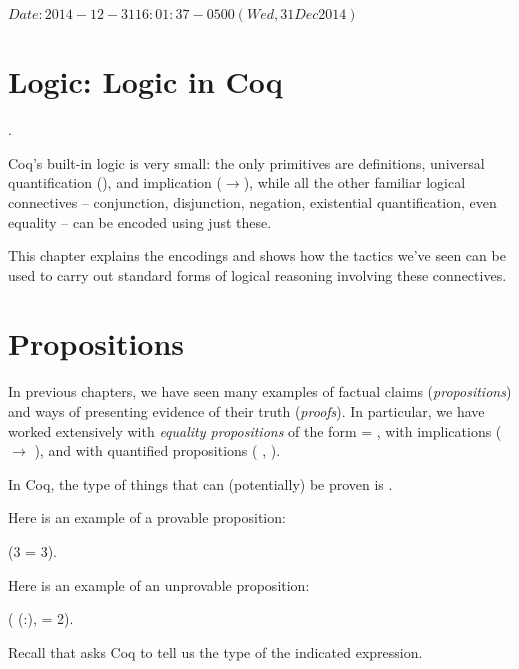 \documentclass[12pt]{report}
\begin{document}
 $Date: 2014-12-31 16:01:37 -0500 (Wed, 31 Dec 2014) $ \begin{coqdoccode}
\coqdocemptyline
\end{coqdoccode}

\begin{coqdoccode}
\end{coqdoccode}
\section{Logic: Logic in Coq}

\begin{coqdoccode}
\coqdocemptyline
\coqdocnoindent
{}  .\coqdoceol
\coqdocemptyline
\end{coqdoccode}
Coq's built-in logic is very small: the only primitives are
     definitions, universal quantification (\coqdockw{\ensuremath{\forall}}), and
    implication (\ensuremath{\rightarrow}), while all the other familiar logical
    connectives -- conjunction, disjunction, negation, existential
    quantification, even equality -- can be encoded using just these.


    This chapter explains the encodings and shows how the tactics
    we've seen can be used to carry out standard forms of logical
    reasoning involving these connectives.


\begin{coqdoccode}
\coqdocemptyline
\end{coqdoccode}
\section{Propositions}



 In previous chapters, we have seen many examples of factual
    claims (\textit{propositions}) and ways of presenting evidence of their
    truth (\textit{proofs}).  In particular, we have worked extensively with
    \textit{equality propositions} of the form  = , with
    implications ( \ensuremath{\rightarrow} ), and with quantified propositions 
    (\coqdockw{\ensuremath{\forall}} , ).  


 In Coq, the type of things that can (potentially) 
    be proven is . 

 Here is an example of a provable proposition: \begin{coqdoccode}
\coqdocemptyline
\coqdocnoindent
{} (3 = 3).\coqdoceol
\coqdocemptyline
\end{coqdoccode}
Here is an example of an unprovable proposition: \begin{coqdoccode}
\coqdocemptyline
\coqdocnoindent
{} (\coqdockw{\ensuremath{\forall}} (:),  = 2).\coqdoceol
\coqdocemptyline
\end{coqdoccode}
Recall that  asks Coq to tell us the type of the indicated 
  expression. \begin{coqdoccode}
\coqdocemptyline
\end{coqdoccode}
\end{document}
